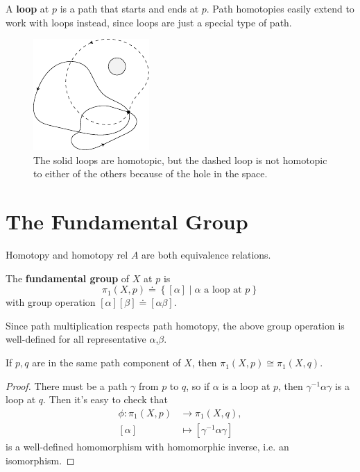 \documentclass[twoside,10pt]{report}
\begin{document}
A \textbf{loop} at $p$ is a path that starts and ends at $p$. Path homotopies easily extend to work with loops instead, since loops are just a special type of path.

\begin{figure}[H]
	\centering
	\includegraphics[scale=1.5]{fig/homotopic.pdf}
	\caption{The solid loops are homotopic, but the dashed loop is not homotopic to either of the others because of the hole in the space.}
\end{figure}



\section{The Fundamental Group}

\begin{lem}
Homotopy and homotopy rel $A$ are both equivalence relations.
\end{lem}

\begin{defn}[]
	The \textbf{fundamental group} of $X$ at $p$ is
	\[
		\pi_1(X,p) \doteq \left\{ [\alpha] \;|\; \alpha \text{ a loop at } p \right\}
	\] 
	with group operation
	$
		[\alpha][\beta] \doteq [\alpha \beta].
	$ 
\end{defn}

Since path multiplication respects path homotopy, the above group operation is well-defined for all representative $\alpha$,$\beta$.

\begin{prop}
	If $p,q$ are in the same path component of $X$, then $\pi_1(X,p) \cong \pi_1(X,q)$.
\end{prop}
\begin{proof}
	There must be a path $\gamma$ from $p$ to $q$, so if $\alpha$ is a loop at $p$, then $\gamma^{-1}\alpha\gamma$ is a loop at $q$. Then it's easy to check that
	\begin{align*}
		\phi:\pi_1(X,p)&\to \pi_1(X,q),\\
		[\alpha]&\mapsto [\gamma^{-1}\alpha\gamma]
	\end{align*}
	is a well-defined homomorphism with homomorphic inverse, i.e. an isomorphism.
\end{proof}
\end{document}
